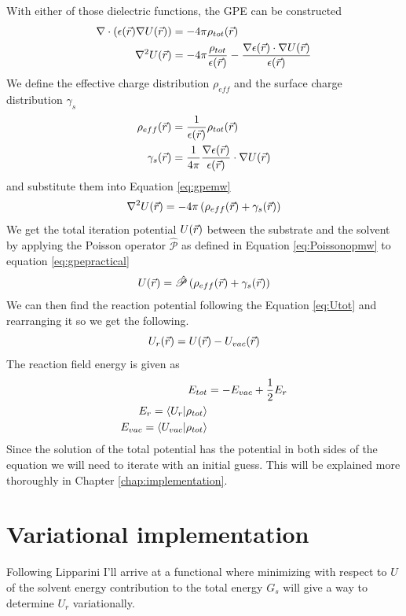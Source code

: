 \documentclass[../master_thesis.tex]{subfiles}
\begin{document}
With either of those dielectric functions, the \ac{GPE} can be constructed
\cite{Sorland, FossoTande:2013ka}
\begin{align}\label{eq:gpemw}
  \nabla\cdot (\epsilon(\vec{r})\nabla U(\vec{r})) &= -4\pi \rho_{tot}(\vec{r}) \\
  \nabla^2U(\vec{r}) &= -4\pi \frac{\rho_{tot}}{\epsilon(\vec{r})} - \frac{\nabla
  \epsilon(\vec{r})\cdot \nabla U(\vec{r})}{\epsilon(\vec{r})}
\end{align}
We define the effective charge distribution $\rho_{eff}$ and the surface charge
distribution $\gamma_s$ \cite{FossoTande:2013ka}
\begin{align}\label{eq:effrhogamma}
  \rho_{eff}(\vec{r}) &= \frac{1}{\epsilon(\vec{r})}\rho_{tot}(\vec{r}) \\
  \gamma_s(\vec{r}) &= \frac{1}{4\pi}\frac{\nabla\epsilon(\vec{r})}{\epsilon(\vec{r})}\cdot\nabla U(\vec{r})
\end{align}
and substitute them into Equation \ref{eq:gpemw}
\begin{equation}\label{eq:gpepractical}
  \nabla^2U(\vec{r}) = -4\pi\left( \rho_{eff}(\vec{r}) + \gamma_s(\vec{r})\right)
\end{equation}
We get the total iteration potential $U(\vec{r})$ between the substrate and the solvent by
applying the Poisson operator $\hat{\mathscr{P}}$ as defined in Equation
\ref{eq:Poissonopmw} to equation \ref{eq:gpepractical}
\begin{equation}
  U(\vec{r}) = \hat{\mathscr{P}}\left( \rho_{eff}(\vec{r}) + \gamma_s(\vec{r})\right)
\end{equation}
We can then find the reaction potential following the Equation \ref{eq:Utot} and
rearranging it so we get the following.
\begin{equation}
  U_r(\vec{r}) = U(\vec{r}) - U_{vac}(\vec{r})
\end{equation}
The reaction field energy is given as \cite{FossoTande:2013ka}
\begin{align}
  E_{tot} &= - E_{vac} + \frac{1}{2}E_r \\
  E_r = \braket{U_r | \rho_{tot}}\\
  E_{vac} = \braket{U_{vac}| \rho_{tot}}
\end{align}
Since the solution of the total potential has the potential in both sides of the
equation we will need to iterate with an initial guess. This will be explained
more thoroughly in Chapter \ref{chap:implementation}.

\section{Variational implementation}
Following Lipparini \cite{Lipparini:2010bg, Lipparini:2013} I'll arrive at a functional where
minimizing with respect to $U$ of the solvent energy contribution to
the total energy $G_s$ will give a way to determine $U_r$ variationally.
\end{document}
